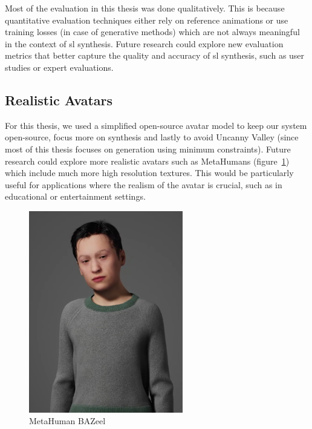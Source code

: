 \documentclass[../../main.tex]{subfiles}
\begin{document}
Most of the evaluation in this thesis was done qualitatively. This is because quantitative evaluation techniques either rely on reference animations or use training losses (in case of generative methods) which are not always meaningful in the context of \gls{sl} synthesis. Future research could explore new evaluation metrics that better capture the quality and accuracy of \gls{sl} synthesis, such as user studies or expert evaluations.

\subsection{Realistic Avatars}
\label{ch:conclusion:future:realistic_avatars}

For this thesis, we used a simplified open-source avatar model to keep our system open-source, focus more on synthesis and lastly to avoid Uncanny Valley (since most of this thesis focuses on generation using minimum constraints). Future research could explore more realistic avatars such as MetaHumans (figure~\ref{fig:conclusion:metahuman_bazeel}) which include much more high resolution textures. This would be particularly useful for applications where the realism of the avatar is crucial, such as in educational or entertainment settings. 

\begin{figure}[h]
    \centering
    \includegraphics[width=0.6\textwidth]{chapters/conclusion/images/metahuman_bazeel.png}
    \caption{MetaHuman BAZeel}
    \label{fig:conclusion:metahuman_bazeel}
\end{figure}
\end{document}
